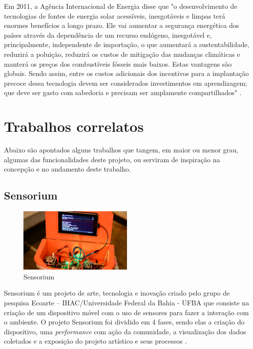 \documentclass[final,12pt, times, 5p, twocolumn]{elsarticle}
\begin{document}
Em 2011, a Agência Internacional de Energia disse que "o desenvolvimento de tecnologias de fontes de energia solar acessíveis, inesgotáveis e limpas terá enormes benefícios a longo prazo. Ele vai aumentar a segurança energética dos países através da dependência de um recurso endógeno, inesgotável e, principalmente, independente de importação, o que aumentará a sustentabilidade, reduzirá a poluição, reduzirá os custos de mitigação das mudanças climáticas e manterá os preços dos combustíveis fósseis mais baixos. Estas vantagens são globais. Sendo assim, entre os custos adicionais dos incentivos para a implantação precoce dessa tecnologia devem ser considerados investimentos em aprendizagem; que deve ser gasto com sabedoria e precisam ser amplamente compartilhados" \cite{artigoenergiasolar}.

\section{Trabalhos correlatos}

Abaixo são apontados alguns trabalhos que tangem, em maior ou menor grau, algumas das funcionalidades deste projeto, ou serviram de inspiração na concepção e no andamento deste trabalho.

\subsection{Sensorium}

\begin{figure}[ht!]
\centering
\includegraphics[width=0.5\textwidth]{sensorium.png}
\caption{\label{fig:sensorium.png}Sensorium}
\end{figure}

Sensorium é um projeto de arte, tecnologia e inovação criado pelo grupo de pesquisa Ecoarte – IHAC/Universidade Federal da Bahia - UFBA que consiste na criação de um dispositivo móvel com o uso de sensores para fazer a interação com o ambiente. O projeto Sensorium foi dividido em 4 fases, sendo elas a criação do dispositivo, uma \textit{performance} com ação da comunidade, a visualização dos dados coletados e a exposição do projeto artístico e seus processos \cite{artigosensorium}.
\end{document}
